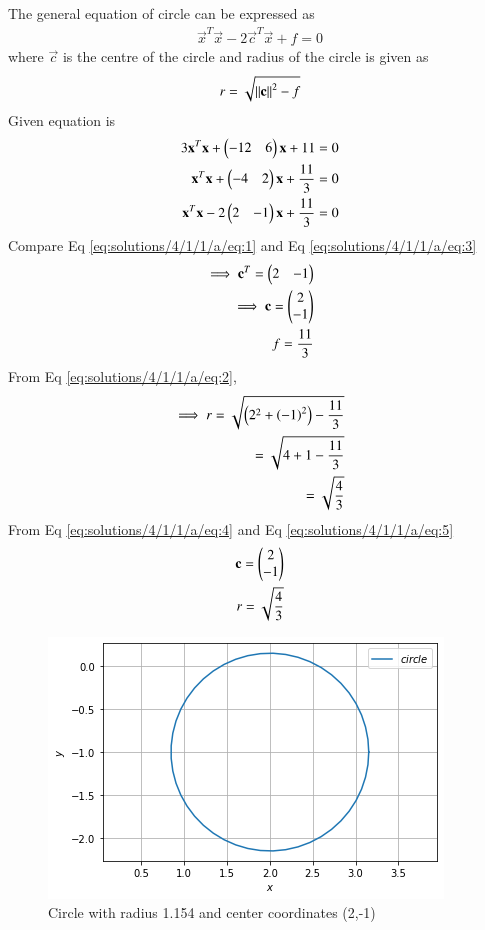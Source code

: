 
The general equation of circle can be expressed as
\begin{align}
    \vec{x}^T\vec{x}-2\vec{c}^T\vec{x}+f = 0\label{eq:solutions/4/1/1/a/eq:1}
\end{align}
where $\vec{c}$ is the centre of the circle and radius of the circle is given as
\begin{align}
r = \sqrt{\left\lVert\mathbf{c}\right\rVert^2 - f}\label{eq:solutions/4/1/1/a/eq:2}
\end{align}
Given equation is
\begin{align}
3\mathbf{x}^T\mathbf{x}+\begin{pmatrix}-12 & 6\end{pmatrix}\mathbf{x}+ 11 = 0\\
\mathbf{x}^T\mathbf{x}+\begin{pmatrix}-4 & 2\end{pmatrix}\mathbf{x}+ \frac{11}{3} = 0\\
\mathbf{x}^T\mathbf{x}-2\begin{pmatrix}2 & -1\end{pmatrix}\mathbf{x}+ \frac{11}{3} = 0\label{eq:solutions/4/1/1/a/eq:3}
\end{align}
Compare Eq \eqref{eq:solutions/4/1/1/a/eq:1} and Eq \eqref{eq:solutions/4/1/1/a/eq:3}
\begin{align}
\implies\mathbf{c}^{T} = \begin{pmatrix}2 & -1\end{pmatrix}\\
\implies\mathbf{c} = \begin{pmatrix}2 \\ -1\end{pmatrix}\label{eq:solutions/4/1/1/a/eq:4}\\
f = \frac{11}{3}
\end{align}
From Eq \eqref{eq:solutions/4/1/1/a/eq:2},
\begin{align}
    \implies r=\sqrt{\left(2^2 + \left(-1\right)^2\right) - \frac{11}{3}}\\
    = \sqrt{4 + 1 - \frac{11}{3}}\\
    = \sqrt{\frac{4}{3}}\label{eq:solutions/4/1/1/a/eq:5}
\end{align}
From Eq \eqref{eq:solutions/4/1/1/a/eq:4} and Eq \eqref{eq:solutions/4/1/1/a/eq:5}
\begin{align}
   \mathbf{c} = \begin{pmatrix}2 \\ -1\end{pmatrix}\\
    r = \sqrt{\frac{4}{3}}
\end{align}
\begin{figure}[!ht]
\centering
\includegraphics[width=\columnwidth]{./solutions/4/1/1/a/A4.png}
\caption{Circle with radius 1.154 and center coordinates (2,-1)}
\label{eq:solutions/4/1/1/a/Fig:1}
\end{figure}
